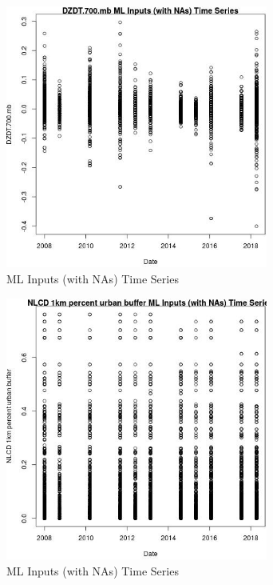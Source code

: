 \begin{figure} 
\centering  
\includegraphics[width=0.77\textwidth]{Code_Outputs/Report_ML_input_PM25_Step4_part_e_de_duplicated_aves_compiled_2019-05-18wNAs_DZDT700mbvDate.jpg} 
\caption{\label{fig:Report_ML_input_PM25_Step4_part_e_de_duplicated_aves_compiled_2019-05-18wNAsDZDT700mbvDate}ML Inputs (with NAs) Time Series} 
\end{figure} 
 

\begin{figure} 
\centering  
\includegraphics[width=0.77\textwidth]{Code_Outputs/Report_ML_input_PM25_Step4_part_e_de_duplicated_aves_compiled_2019-05-18wNAs_NLCD_1km_percent_urban_buffervDate.jpg} 
\caption{\label{fig:Report_ML_input_PM25_Step4_part_e_de_duplicated_aves_compiled_2019-05-18wNAsNLCD_1km_percent_urban_buffervDate}ML Inputs (with NAs) Time Series} 
\end{figure} 
 

